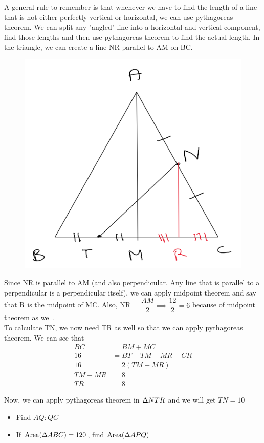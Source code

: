 A general rule to remember is that whenever we have to find the length of a line that is not either perfectly vertical or horizontal, we can use pythagoreas theorem. We can split any "angled" line into a horizontal and vertical component, find those lengths and then use pythagoreas theorem to find the actual length. In the triangle, we can create a line NR parallel to AM on BC. 

\begin{figure}[h!]
    \centering
    \includegraphics[width=0.35\linewidth]{Quant//Geometry//Images//Triangles/triangle_12_midpoint_q1_ans_1.png}
\end{figure}

Since NR is parallel to AM (and also perpendicular. Any line that is parallel to a perpendicular is a perpendicular itself), we can apply midpoint theorem and say that R is the midpoint of MC. Also, NR = $\dfrac{AM}{2} \implies \dfrac{12}{2} = 6$ because of midpoint theorem as well. \\

To calculate TN, we now need TR as well so that we can apply pythagoreas theorem. We can see that 
\begin{align*}
    BC &= BM + MC \\
    16 &= BT + TM + MR + CR \\
    16 &= 2 (TM + MR) \tag{BT = TM and MR = CR} \\
    TM + MR &= 8 \\
    TR &= 8 \tag{TM + MR = TR}
\end{align*}

Now, we can apply pythagoreas theorem in $\Delta {NTR}$ and we will get $TN = 10$

\newpage
{}
\begin{itemize}
    \item Find $AQ : QC$
    \item If $\text{Area}({\Delta {ABC}}) = 120$, find $\text{Area}({\Delta {APQ}})$
\end{itemize}


